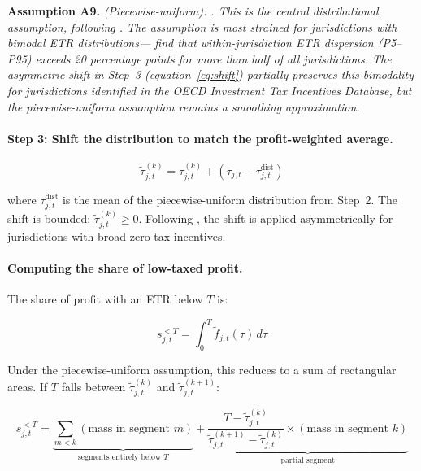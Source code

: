\documentclass[11pt,a4paper]{article}
\newcommand{\assumption}[2]{\noindent\textbf{Assumption #1.} \textit{#2}\medskip}
\begin{document}
\assumption{A9}{(Piecewise-uniform): . This is the central distributional assumption, following \citet{hugger2026}.  The assumption is most strained for jurisdictions with bimodal ETR distributions---\citet{hugger2026} find that within-jurisdiction ETR dispersion (P5--P95) exceeds 20 percentage points for more than half of all jurisdictions. The asymmetric shift in Step~3 (equation~\eqref{eq:shift}) partially preserves this bimodality for jurisdictions identified in the OECD Investment Tax Incentives Database, but the piecewise-uniform assumption remains a smoothing approximation.}

\paragraph{Step 3: Shift the distribution to match the profit-weighted average.}

\begin{equation}\label{eq:shift}
\tilde{\tau}_{j,t}^{(k)} = \tau_{j,t}^{(k)} + \left(\bar{\tau}_{j,t} - \bar{\tau}_{j,t}^{\text{dist}}\right)
\end{equation}

where $\bar{\tau}_{j,t}^{\text{dist}}$ is the mean of the piecewise-uniform distribution from Step~2. The shift is bounded: $\tilde{\tau}_{j,t}^{(k)} \geq 0$. Following \citet{hugger2026}, the shift is applied asymmetrically for jurisdictions with broad zero-tax incentives.

\paragraph{Computing the share of low-taxed profit.}
The share of profit with an ETR below $T$ is:

\begin{equation}\label{eq:lowtax_share}
s_{j,t}^{<T} = \int_0^{T} \tilde{f}_{j,t}(\tau) \, d\tau
\end{equation}

Under the piecewise-uniform assumption, this reduces to a sum of rectangular areas. If $T$ falls between $\tilde{\tau}_{j,t}^{(k)}$ and $\tilde{\tau}_{j,t}^{(k+1)}$:

\begin{equation}\label{eq:lowtax_share_pw}
s_{j,t}^{<T} = \underbrace{\sum_{m < k} (\text{mass in segment } m)}_{\text{segments entirely below } T} + \underbrace{\frac{T - \tilde{\tau}_{j,t}^{(k)}}{\tilde{\tau}_{j,t}^{(k+1)} - \tilde{\tau}_{j,t}^{(k)}} \times (\text{mass in segment } k)}_{\text{partial segment}}
\end{equation}
\end{document}
